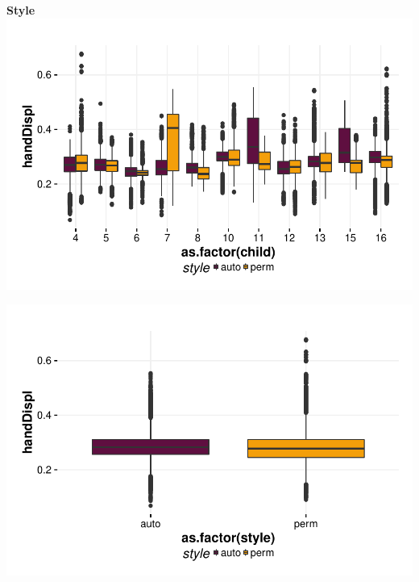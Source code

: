 \documentclass{article}
\begin{document}
\textbf{Style}
\includegraphics{features-plot_handdisplacement_child_style_quiz}

\includegraphics{features-plot_handdisplacement_style_quiz}
\end{document}
